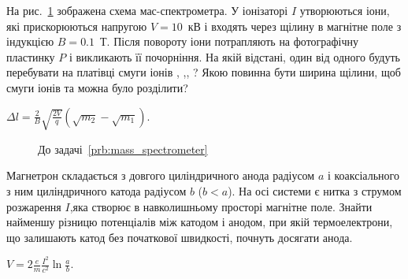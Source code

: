 \begin{problem}\label{prb:mass_spectrometer}%
На рис.~\ref{mass_spectrometer} зображена схема мас-спектрометра. У іонізаторі $I$ утворюються іони, які прискорюються напругою $V = 10$~кВ і входять через щілину в магнітне поле з індукцією $B = 0.1$~Т. Після повороту іони потрапляють на фотографічну пластинку $P$ і викликають її почорніння. На якій відстані, один від одного будуть перебувати на платівці смуги іонів , ,, ? Якою повинна бути ширина щілини, щоб смуги іонів  та  можна було розділити?
\begin{solution}
	$\Delta l = \frac{2}{B}\sqrt{\frac{2V}{q}} \left( \sqrt{m_2} - \sqrt{m_1} \right) $.
\end{solution}
\end{problem}
\begin{figure}[h!]\centering
\caption{До задачі~\ref{prb:mass_spectrometer}}
\label{mass_spectrometer}
\end{figure}

\begin{problem}
Магнетрон складається з довгого циліндричного анода радіусом $a$ і коаксіального з ним циліндричного катода радіусом $b$ ($b < a $). На осі системи є нитка з струмом розжарення $I$,яка створює в навколишньому просторі магнітне поле. Знайти найменшу різницю потенціалів між катодом і анодом, при якій термоелектрони, що залишають катод без початкової швидкості, почнуть досягати анода.
\begin{solution}
	$V = 2\frac{e}{m}\frac{I^2}{c^2}\ln\frac{a}{b}$.
\end{solution}
\end{problem}


